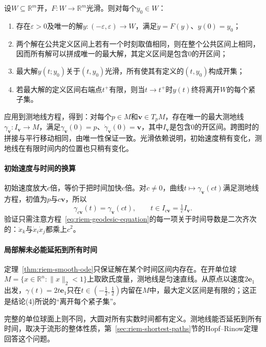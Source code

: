 \begin{theorem}[光滑常微分方程的局部理论]
\label{thm:riem-smooth-ode}
设$W\subseteq\mathbb R^m$开，$F:W\to\mathbb R^m$光滑。则对每个$y_0\in W$：
\begin{enumerate}
\item 存在$\varepsilon>0$及唯一的解$y:(-\varepsilon,\varepsilon)\to W$，满足$\dot y=F(y)$、$y(0)=y_0$；
\item 两个解在公共定义区间上若有一个时刻取值相同，则在整个公共区间上相同，因而所有解可以拼成唯一的最大解，其定义区间是包含$0$的开区间；
\item 最大解$y(t;y_0)$关于$(t,y_0)$光滑，所有使其有定义的$(t,y_0)$构成开集；
\item 若最大解的定义区间右端点$t^+$有限，则当$t\to t^+$时$y(t)$终将离开$W$的每个紧子集。
\end{enumerate}
\end{theorem}

应用到测地线方程，得到：对每个$p\in M$和$\bm v\in T_pM$，存在唯一的最大测地线$\gamma_{\bm v}:I_{\bm v}\to M$，满足$\gamma_{\bm v}(0)=p$、$\dot\gamma_{\bm v}(0)=\bm v$，其中$I_{\bm v}$是包含$0$的开区间。跨图时的拼接与平行移动相同，由唯一性保证一致。光滑依赖说明，初始速度稍有变化，测地线在有限时间内的位置也只稍有变化。

\paragraph{初始速度与时间的换算}
初始速度放大$c$倍，等价于把时间加快$c$倍。对$c\neq0$，曲线$t\mapsto\gamma_{\bm v}(ct)$满足测地线方程，初值为$p$与$c\bm v$，所以
\begin{equation}
\gamma_{c\bm v}(t)=\gamma_{\bm v}(ct),\qquad t\in I_{c\bm v}=\tfrac1cI_{\bm v} .
\label{eq:riem-geodesic-rescaling}
\end{equation}
验证只需注意方程~\eqref{eq:riem-geodesic-equation}的每一项关于时间导数是二次齐次的：$\ddot x_k$与$\dot x_i\dot x_j$都乘上$c^2$。

\paragraph{局部解未必能延拓到所有时间}
定理~\ref{thm:riem-smooth-ode}只保证解在某个时间区间内存在。在开单位球$M=\{x\in\mathbb R^n:\lVert x\rVert_2<1\}$上取欧氏度量，测地线是匀速直线。从原点以速度$2\bm e_1$出发，$\gamma(t)=2t\bm e_1$只在$t\in(-\tfrac12,\tfrac12)$内留在$M$中，最大定义区间是有限的；这正是结论(4)所说的“离开每个紧子集”。

完整的单位球面上则不同，大圆对所有实数时间都有定义。测地线能否延拓到所有时间，取决于流形的整体性质，第~\ref{sec:riem-shortest-paths}节的Hopf--Rinow定理回答这个问题。

